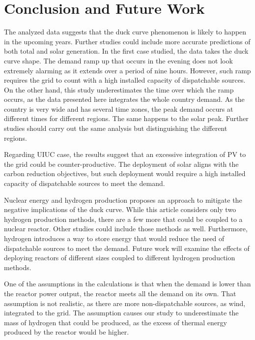 \documentclass{anstrans}
\begin{document}
\section{Conclusion and Future Work}

The analyzed data suggests that the duck curve phenomenon is likely to happen in the upcoming years.
Further studies could include more accurate predictions of both total and solar generation.
In the first case studied, the data takes the duck curve shape.
The demand ramp up that occurs in the evening does not look extremely alarming as it extends over a period of nine hours.
However, such ramp requires the grid to count with a high installed capacity of dispatchable sources.
On the other hand, this study underestimates the time over which the ramp occurs, as the data presented here integrates the whole country demand.
As the country is very wide and has several time zones, the peak demand occurs at different times for different regions. The same happens to the solar peak.
Further studies should carry out the same analysis but distinguishing the different regions.

Regarding \gls{UIUC} case, the results suggest that an excessive integration of \gls{PV} to the grid could be counter-productive.
The deployment of solar aligns with the carbon reduction objectives, but such deployment would require a high installed capacity of dispatchable sources to meet the demand.

Nuclear energy and hydrogen production proposes an approach to mitigate the negative implications of the duck curve.
While this article considers only two hydrogen production methods, there are a few more that could be coupled to a nuclear reactor.
Other studies could include those methods as well.
Furthermore, hydrogen introduces a way to store energy that would reduce the need of dispatchable sources to meet the demand.
Future work will examine the effects of deploying reactors of different sizes coupled to different hydrogen production methods.

One of the assumptions in the calculations is that when the demand is lower than the reactor power output, the reactor meets all the demand on its own.
That assumption is not realistic, as there are more non-dispatchable sources, as wind, integrated to the grid.
The assumption causes our study to underestimate the mass of hydrogen that could be produced, as the excess of thermal energy produced by the reactor would be higher.



\end{document}
